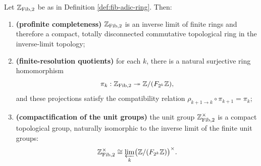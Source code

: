 \begin{proposition}\label{prop:fib-adic-basic}
Let \(\mathbb{Z}_{\mathrm{Fib},2}\) be as in Definition \ref{def:fib-adic-ring}. Then:
\begin{enumerate}
  \item \textbf{(profinite completeness)} \(\mathbb{Z}_{\mathrm{Fib},2}\) is an inverse limit of finite rings and therefore a compact, totally disconnected commutative topological ring in the inverse-limit topology;
  \item \textbf{(finite-resolution quotients)} for each \(k\), there is a natural surjective ring homomorphism
\[
\pi_k:\mathbb{Z}_{\mathrm{Fib},2}\twoheadrightarrow \mathbb{Z}/(F_{2^k}\mathbb{Z}),
\]
and these projections satisfy the compatibility relation \(\rho_{k+1\to k}\circ \pi_{k+1}=\pi_k\);
  \item \textbf{(compactification of the unit groups)} the unit group \(\mathbb{Z}_{\mathrm{Fib},2}^\times\) is a compact topological group, naturally isomorphic to the inverse limit of the finite unit groups:
\[
\mathbb{Z}_{\mathrm{Fib},2}^\times\cong \varprojlim_k \bigl(\mathbb{Z}/(F_{2^k}\mathbb{Z})\bigr)^\times.
\]
\end{enumerate}
\end{proposition}

